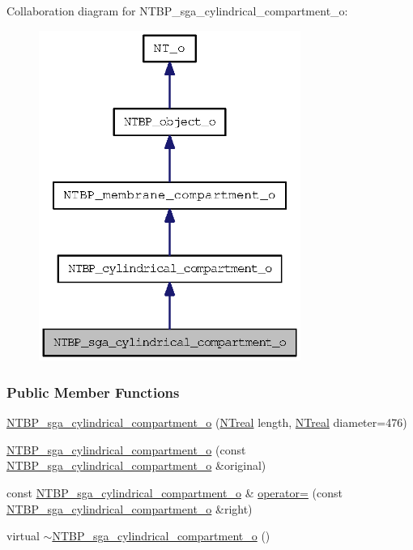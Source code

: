 Collaboration diagram for NTBP\_\-sga\_\-cylindrical\_\-compartment\_\-o:
\nopagebreak
\begin{figure}[H]
\begin{center}
\leavevmode
\includegraphics[width=242pt]{class_n_t_b_p__sga__cylindrical__compartment__o__coll__graph}
\end{center}
\end{figure}
\subsubsection*{Public Member Functions}
\begin{DoxyCompactItemize}
\item 
\hyperlink{class_n_t_b_p__sga__cylindrical__compartment__o_a467b4971018e99fc8b4c92b8acb79a6f}{NTBP\_\-sga\_\-cylindrical\_\-compartment\_\-o} (\hyperlink{nt__types_8h_a814a97893e9deb1eedcc7604529ba80d}{NTreal} length, \hyperlink{nt__types_8h_a814a97893e9deb1eedcc7604529ba80d}{NTreal} diameter=476)
\item 
\hyperlink{class_n_t_b_p__sga__cylindrical__compartment__o_a15dee18efefbd5006e26a7ef4d39dcf3}{NTBP\_\-sga\_\-cylindrical\_\-compartment\_\-o} (const \hyperlink{class_n_t_b_p__sga__cylindrical__compartment__o}{NTBP\_\-sga\_\-cylindrical\_\-compartment\_\-o} \&original)
\item 
const \hyperlink{class_n_t_b_p__sga__cylindrical__compartment__o}{NTBP\_\-sga\_\-cylindrical\_\-compartment\_\-o} \& \hyperlink{class_n_t_b_p__sga__cylindrical__compartment__o_ab77333e8ccfd82e931e04378ad14beb4}{operator=} (const \hyperlink{class_n_t_b_p__sga__cylindrical__compartment__o}{NTBP\_\-sga\_\-cylindrical\_\-compartment\_\-o} \&right)
\item 
virtual \hyperlink{class_n_t_b_p__sga__cylindrical__compartment__o_af9dc0d220ad6b1f1a9cfbed85139bca5}{$\sim$NTBP\_\-sga\_\-cylindrical\_\-compartment\_\-o} ()
\end{DoxyCompactItemize}


